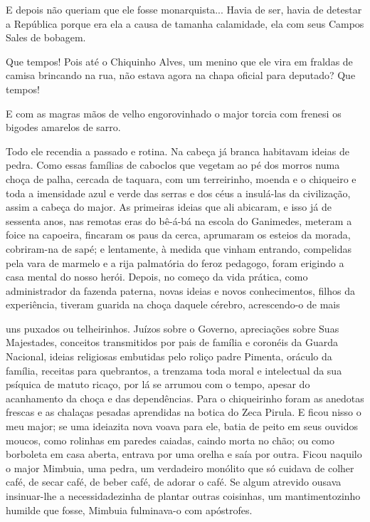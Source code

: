 E depois não queriam que ele fosse monarquista... Havia de ser, havia de
detestar a República porque era ela a causa de tamanha calamidade, ela
com seus Campos Sales de bobagem.

Que tempos! Pois até o Chiquinho Alves, um menino que ele vira em
fraldas de camisa brincando na rua, não estava agora na chapa oficial
para deputado? Que tempos!

E com as magras mãos de velho engorovinhado o major torcia com frenesi
os bigodes amarelos de sarro.

Todo ele recendia a passado e rotina. Na cabeça já branca habitavam
ideias de pedra. Como essas famílias de caboclos que vegetam ao pé dos
morros numa choça de palha, cercada de taquara, com um terreirinho,
moenda e o chiqueiro e toda a imensidade azul e verde das serras e dos
céus a insulá-las da civilização, assim a cabeça do major. As primeiras
ideias que ali abicaram, e isso já de sessenta anos, nas remotas eras do
bê-á-bá na escola do Ganimedes, meteram a foice na capoeira, fincaram os
paus da cerca, aprumaram os esteios da morada, cobriram-na de sapé; e
lentamente, à medida que vinham entrando, compelidas pela vara de
marmelo e a rija palmatória do feroz pedagogo, foram erigindo a casa
mental do nosso herói. Depois, no começo da vida prática, como
administrador da fazenda paterna, novas ideias e novos conhecimentos,
filhos da experiência, tiveram guarida na choça daquele cérebro,
acrescendo-o de mais

uns puxados ou telheirinhos. Juízos sobre o Governo, apreciações sobre
Suas Majestades, conceitos transmitidos por pais de família e coronéis
da Guarda Nacional, ideias religiosas embutidas pelo roliço padre
Pimenta, oráculo da família, receitas para quebrantos, a trenzama toda
moral e intelectual da sua psíquica de matuto ricaço, por lá se arrumou
com o tempo, apesar do acanhamento da choça e das dependências. Para o
chiqueirinho foram as anedotas frescas e as chalaças pesadas aprendidas
na botica do Zeca Pirula. E ficou nisso o meu major; se uma ideiazita
nova voava para ele, batia de peito em seus ouvidos moucos, como
rolinhas em paredes caiadas, caindo morta no chão; ou como borboleta em
casa aberta, entrava por uma orelha e saía por outra. Ficou naquilo o
major Mimbuia, uma pedra, um verdadeiro monólito que só cuidava de
colher café, de secar café, de beber café, de adorar o café. Se algum
atrevido ousava insinuar-lhe a necessidadezinha de plantar outras
coisinhas, um mantimentozinho humilde que fosse, Mimbuia fulminava-o com
apóstrofes.

